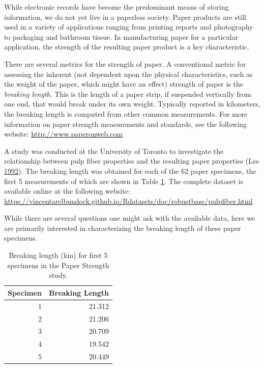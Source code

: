 \documentclass[]{book}
\theoremstyle{plain}
\theoremstyle{mydefn}
\theoremstyle{myexmpl}
\theoremstyle{remark}
\let\BeginKnitrBlock\begin \let\EndKnitrBlock\end
\let\BeginKnitrBlock\begin \let\EndKnitrBlock\end
\begin{document}
\BeginKnitrBlock{example}[Paper Strength]
\protect\hypertarget{exm:summaries-paper}{}{\label{exm:summaries-paper}
{} }While electronic records have become
the predominant means of storing information, we do not yet live in a
paperless society. Paper products are still used in a variety of
applications ranging from printing reports and photography to packaging
and bathroom tissue. In manufacturing paper for a particular
application, the strength of the resulting paper product is a key
characteristic.

There are several metrics for the strength of paper. A conventional
metric for assessing the inherent (not dependent upon the physical
characteristics, such as the weight of the paper, which might have an
effect) strength of paper is the \emph{breaking length}. This is the
length of a paper strip, if suspended vertically from one end, that
would break under its own weight. Typically reported in kilometers, the
breaking length is computed from other common measurements. For more
information on paper strength measurements and standards, see the
following website: \url{http://www.paperonweb.com}

A study was conducted at the University of Toronto to investigate the
relationship between pulp fiber properties and the resulting paper
properties (Lee \protect\hyperlink{ref-Lee1992}{1992}). The breaking
length was obtained for each of the 62 paper specimens, the first 5
measurements of which are shown in Table
\ref{tab:summaries-paper-table}. The complete dataset is available
online at the following website:
\url{https://vincentarelbundock.github.io/Rdatasets/doc/robustbase/pulpfiber.html}

While there are several questions one might ask with the available data,
here we are primarily interested in characterizing the breaking length
of these paper specimens.
\EndKnitrBlock{example}

\begin{table}

\caption{\label{tab:summaries-paper-table}Breaking length (km) for first 5 specimens in the Paper Strength study.}
\centering
\begin{tabular}[t]{r|r}
\hline
Specimen & Breaking Length\\
\hline
1 & 21.312\\
\hline
2 & 21.206\\
\hline
3 & 20.709\\
\hline
4 & 19.542\\
\hline
5 & 20.449\\
\hline
\end{tabular}
\end{table}
\end{document}
